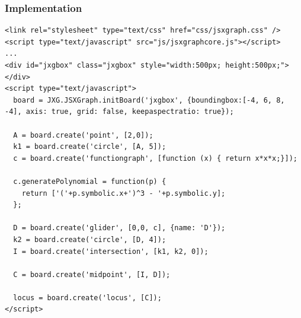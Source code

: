 \documentclass{beamer}
\begin{document}
\begin{frame}[fragile]
  \frametitle{Implementation}

  \begin{block}{}
    \begin{lstlisting}
<link rel="stylesheet" type="text/css" href="css/jsxgraph.css" />
<script type="text/javascript" src="js/jsxgraphcore.js"></script>
...
<div id="jxgbox" class="jxgbox" style="width:500px; height:500px;"></div>
<script type="text/javascript">
  board = JXG.JSXGraph.initBoard('jxgbox', {boundingbox:[-4, 6, 8, -4], axis: true, grid: false, keepaspectratio: true});

  A = board.create('point', [2,0]);
  k1 = board.create('circle', [A, 5]);
  c = board.create('functiongraph', [function (x) { return x*x*x;}]);

  c.generatePolynomial = function(p) {
    return ['('+p.symbolic.x+')^3 - '+p.symbolic.y];
  };

  D = board.create('glider', [0,0, c], {name: 'D'});
  k2 = board.create('circle', [D, 4]);
  I = board.create('intersection', [k1, k2, 0]);

  C = board.create('midpoint', [I, D]);

  locus = board.create('locus', [C]);
</script>
    \end{lstlisting}
  \end{block}
\end{frame}

\end{document}
